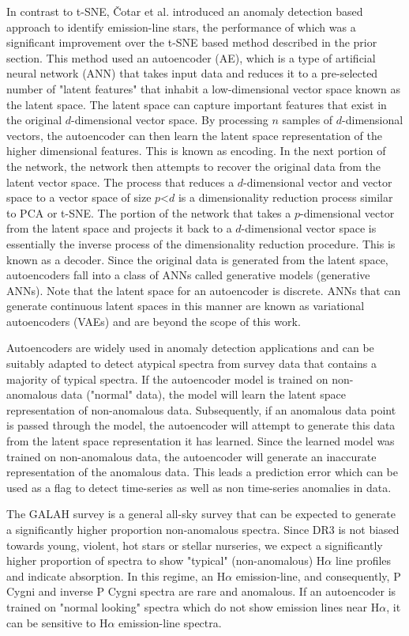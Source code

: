 In contrast to t-SNE, Čotar et al. introduced an anomaly detection based approach to identify emission-line stars, the performance of which was a significant improvement over the t-SNE based method described in the prior section. This method used an autoencoder (AE), which is a type of artificial neural network (ANN) that takes input data and reduces it to a pre-selected number of "latent features" that inhabit a low-dimensional vector space known as the latent space. The latent space can capture important features that exist in the original $d$-dimensional vector space. By processing $n$ samples of $d$-dimensional vectors, the autoencoder can then learn the latent space representation of the higher dimensional features. This is known as encoding. In the next portion of the network, the network then attempts to recover the original data from the latent vector space. The process that reduces a $d$-dimensional vector and vector space to a vector space of size $p$<$d$ is a dimensionality reduction process similar to PCA or t-SNE. The portion of the network that takes a $p$-dimensional vector from the latent space and projects it back to a $d$-dimensional vector space is essentially the inverse process of the dimensionality reduction procedure. This is known as a decoder. Since the original data is generated from the latent space, autoencoders fall into a class of ANNs called generative models (generative ANNs). Note that the latent space for an autoencoder is discrete. ANNs that can generate continuous latent spaces in this manner are known as variational autoencoders (VAEs) and are beyond the scope of this work. 

Autoencoders are widely used in anomaly detection applications \citep{sakurada2014anomaly} and can be suitably adapted to detect atypical spectra from survey data that contains a majority of typical spectra. If the autoencoder model is trained on non-anomalous data ("normal" data), the model will learn the latent space representation of non-anomalous data. Subsequently, if an anomalous data point is passed through the model, the autoencoder will attempt to generate this data from the latent space representation it has learned. Since the learned model was trained on non-anomalous data, the autoencoder will generate an inaccurate representation of the anomalous data. This leads a prediction error which can be used as a flag to detect time-series as well as non time-series anomalies in data.

The GALAH survey is a general all-sky survey that can be expected to generate a significantly higher proportion non-anomalous spectra. Since DR3 is not biased towards young, violent, hot stars or stellar nurseries, we expect a significantly higher proportion of spectra to show "typical" (non-anomalous) H$\alpha$ line profiles and indicate absorption. In this regime, an H$\alpha$ emission-line, and consequently, P Cygni and inverse P Cygni spectra are rare and anomalous. If an autoencoder is trained on "normal looking" spectra which do not show emission lines near H$\alpha$, it can be sensitive to H$\alpha$ emission-line spectra. 

